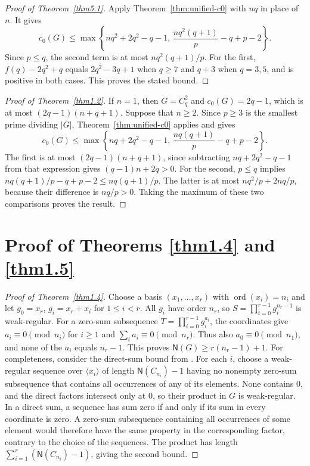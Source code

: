 \documentclass[10pt,reqno]{amsart}
\theoremstyle{definition}
\theoremstyle{remark}
\numberwithin{equation}{section}
\DeclareMathOperator{\ord}{ord}
\begin{document}
\begin{proof}[Proof of Theorem~\ref{thm5.1}]
Apply Theorem~\ref{thm:unified-c0} with $nq$ in place of $n$. It gives
\[
c_0(G)\le\max\left\{nq^2+2q^2-q-1,\,
\frac{nq^2(q+1)}p-q+p-2\right\}.
\]
Since $p\le q$, the second term is at most $nq^2(q+1)/p$.
For the first, $f(q)-2q^2+q$ equals $2q^2-3q+1$ when $q\ge7$
and $q+3$ when $q=3,5$, and is positive in both cases.
This proves the stated bound.
\end{proof}

\begin{proof}[Proof of Theorem~\ref{thm1.2}]
If $n=1$, then $G=C_q^2$ and $c_0(G)=2q-1$, which is at most
$(2q-1)(n+q+1)$.
Suppose that $n\ge2$. Since $p\ge3$ is the smallest prime dividing
$|G|$, Theorem~\ref{thm:unified-c0} applies and gives
\[
c_0(G)\le\max\left\{nq+2q^2-q-1,\,
\frac{nq(q+1)}p-q+p-2\right\}.
\]
The first is at most $(2q-1)(n+q+1)$, since subtracting
$nq+2q^2-q-1$ from that expression gives $(q-1)n+2q>0$.
For the second, $p\le q$ implies
$nq(q+1)/p-q+p-2\le nq(q+1)/p$.
The latter is at most $nq^2/p+2nq/p$, because their difference is
$nq/p>0$.
Taking the maximum of these two comparisons proves the result.
\end{proof}

\section{Proof of Theorems \ref{thm1.4} and \ref{thm1.5}}

\begin{proof}[Proof of Theorem~\ref{thm1.4}]
Choose a basis $(x_1,\ldots,x_r)$ with $\ord(x_i)=n_i$ and let
$g_0=x_r$, $g_i=x_r+x_i$ for $1\le i<r$.
All $g_i$ have order $n_r$, so $S=\prod_{i=0}^{r-1}g_i^{n_r-1}$ is weak-regular.
For a zero-sum subsequence $T=\prod_{i=0}^{r-1}g_i^{a_i}$, the coordinates give
$a_i\equiv0\pmod{n_i}$ for $i\ge1$ and $\sum_i a_i\equiv0\pmod{n_r}$.
Thus also $a_0\equiv0\pmod{n_1}$, and none of the $a_i$ equals $n_r-1$.
This proves $\mathsf{N}(G)\ge r(n_r-1)+1$.
For completeness, consider the direct-sum bound from
\cite[Theorem~1.1(2)]{[GHHLYZ2022-2]}.
For each $i$, choose a weak-regular sequence over $\langle x_i\rangle$
of length $\mathsf N(C_{n_i})-1$ having no nonempty zero-sum subsequence
that contains all occurrences of any of its elements.
None contains $0$, and the direct factors intersect only at $0$, so their
product in $G$ is weak-regular.
In a direct sum, a sequence has sum zero if and only if its sum in every
coordinate is zero. A zero-sum subsequence containing all occurrences of
some element would therefore have the same property in the corresponding
factor, contrary to the choice of the sequences. The product has length
$\sum_{i=1}^r(\mathsf N(C_{n_i})-1)$, giving the second bound.
\end{proof}
\end{document}

